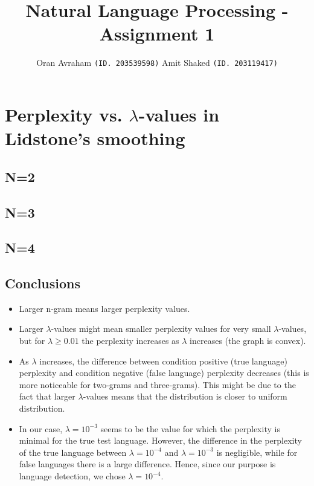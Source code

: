 \documentclass[paper=a4, fontsize=11pt]{scrartcl} %
\title{	
\normalfont \normalsize 
\huge Natural Language Processing - Assignment 1 \\ %
}
\author{
Oran Avraham \texttt{(ID. 203539598)} \quad
Amit Shaked \texttt{(ID. 203119417)}
} %
\date{}
\numberwithin{equation}{section} %
\numberwithin{figure}{section} %
\numberwithin{table}{section} %
\begin{document}
\maketitle %

\section{Perplexity vs. $\lambda$-values in Lidstone's smoothing}

\subsection*{N=2}



\newpage

\subsection*{N=3}



\newpage

\subsection*{N=4}



\subsection*{Conclusions}

\begin{itemize}
	\item Larger n-gram means larger perplexity values.
	\item Larger $\lambda$-values might mean smaller perplexity values for very small $\lambda$-values, but for $\lambda \geq 0.01$
		the perplexity increases as $\lambda$ increases (the graph is convex).
	\item As $\lambda$ increases, the difference between condition positive (true language) perplexity and condition negative
		(false language) perplexity decreases (this is more noticeable for two-grams and three-grams). This might be due to the fact
		that larger $\lambda$-values means that the distribution is closer to uniform distribution.
	\item In our case, $\lambda=10^{-3}$ seems to be the value for which the perplexity is minimal for the true test language. However,
	the difference in the perplexity of the true language between $\lambda=10^{-4}$ and $\lambda=10^{-3}$ is negligible, while for false
	languages there is a large difference. Hence, since our purpose is language detection, we chose $\lambda=10^{-4}$.
\end{itemize}
\end{document}
